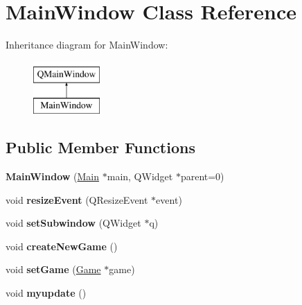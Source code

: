 \hypertarget{classMainWindow}{}\section{Main\+Window Class Reference}
\label{classMainWindow}
Inheritance diagram for Main\+Window\+:\begin{figure}[H]
\begin{center}
\leavevmode
\includegraphics[height=2.000000cm]{classMainWindow}
\end{center}
\end{figure}
\subsection*{Public Member Functions}
\begin{DoxyCompactItemize}
\item 
\mbox{\label{classMainWindow_a6d00d0c625db7096f416034d07ba1acd}} 
{\bfseries Main\+Window} (\hyperlink{classMain}{Main} $\ast$main, Q\+Widget $\ast$parent=0)
\item 
\mbox{\label{classMainWindow_ae12f8f63791595567b6250f8bb002bda}} 
void {\bfseries resize\+Event} (Q\+Resize\+Event $\ast$event)
\item 
\mbox{\label{classMainWindow_a889d39caf6b396921d972800e2fba819}} 
void {\bfseries set\+Subwindow} (Q\+Widget $\ast$q)
\item 
\mbox{\label{classMainWindow_aa8bd15bfe653d4a823453aa2de06b807}} 
void {\bfseries create\+New\+Game} ()
\item 
\mbox{\label{classMainWindow_a33c0c4b08a759f5c32446d284a811947}} 
void {\bfseries set\+Game} (\hyperlink{classGame}{Game} $\ast$game)
\item 
\mbox{\label{classMainWindow_aa78b3f5e5a1226396581fde03f7f1172}} 
void {\bfseries myupdate} ()
\end{DoxyCompactItemize}
